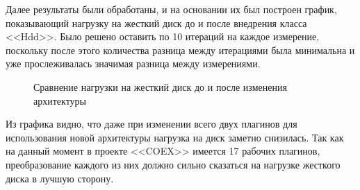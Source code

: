 Далее результаты были обработаны, и на основании их был построен график, показывающий нагрузку на жесткий диск до и после внедрения класса <<Hdd>>. Было решено оставить по 10 итераций на каждое измерение, поскольку после этого количества разница между итерациями была минимальна и уже прослеживалась значимая разница между измерениями.

\begin{figure}[h!]
\caption{ Сравнение нагрузки на жесткий диск до и после изменения архитектуры }
\label{bok_5:bok_5}
\end{figure}

Из графика видно, что даже при изменении всего двух плагинов для использования новой архитектуры нагрузка на диск заметно снизилась. Так как на данный момент в проекте <<COEX>> имеется 17 рабочих плагинов, преобразование каждого из них должно сильно сказаться на нагрузке жесткого диска в лучшую сторону.

\clearpage
